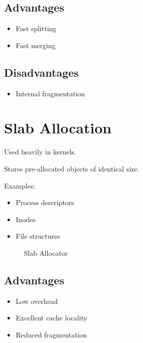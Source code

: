 \subsection{Advantages}

\begin{itemize}
\item Fast splitting
\item Fast merging
\end{itemize}

\subsection{Disadvantages}

\begin{itemize}
\item Internal fragmentation
\end{itemize}

\section{Slab Allocation}

Used heavily in kernels.

Stores pre-allocated objects of identical size.

Examples:

\begin{itemize}
\item Process descriptors
\item Inodes
\item File structures
\end{itemize}

\begin{figure}[H]
\centering
{}
\caption{Slab Allocator}
\end{figure}

\subsection{Advantages}

\begin{itemize}
\item Low overhead
\item Excellent cache locality
\item Reduced fragmentation
\end{itemize}

